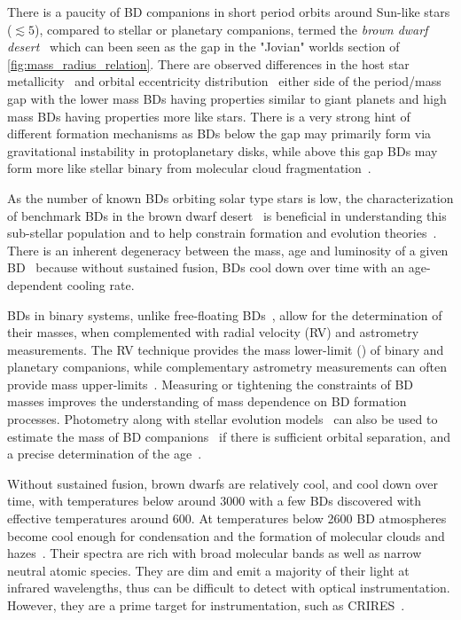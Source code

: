 There is a paucity of {BD} companions in short period orbits around Sun-like stars (\(\lesssim{}5 \)\AU{}), compared to stellar or planetary companions, termed the \emph{brown dwarf desert}~\citep{halbwachs_exploring_2000, zucker_analysis_2001, sahlmann_search_2011, ranc_moa2007blg197_2015} which can been seen as the gap in the "Jovian" worlds section of \cref{fig:mass_radius_relation}.
There are observed differences in the host star metallicity~\citep{maldonado_searching_2017, santos_observational_2017, schlaufman_evidence_2018} and orbital eccentricity distribution~\citep{ma_statistical_2014} either side of the period/mass gap with the lower mass {BD}s having properties similar to giant planets and high mass {BD}s having properties more like stars.
There is a very strong hint of different formation mechanisms as {BD}s below the gap may primarily form via gravitational instability in protoplanetary disks, while above this gap {BD}s may form more like stellar binary from molecular cloud fragmentation~\citep{ma_statistical_2014}.

As the number of known {BD}s orbiting solar type stars is low, the characterization of benchmark {BD}s in the brown dwarf desert~\citep[e.g.][]{crepp_trends_2016} is beneficial in understanding this sub-stellar population and to help constrain formation and evolution theories~\citep{whitworth_formation_2007}.
There is an inherent degeneracy between the mass, age and luminosity of a given BD~\citep{burrows_nongray_1997} because without sustained fusion, {BD}s cool down over time with an age-dependent cooling rate.

{BD}s in binary systems, unlike free-floating {BD}s~\citep[e.g][]{gagne_simp_2017}, allow for the determination of their masses, when complemented with radial velocity ({RV}) and astrometry measurements.
The {RV} technique provides the mass lower-limit (\Mtwosini{}) of binary and planetary companions, while complementary astrometry measurements can often provide mass upper-limits~\citep[e.g.][]{sahlmann_search_2011}.
Measuring or tightening the constraints of {BD} masses improves the understanding of mass dependence on {BD} formation processes.
Photometry along with stellar evolution models~\citep[e.g.][]{baraffe_evolutionary_2003,allard_btsettl_2013} can also be used to estimate the mass of {BD} companions~\citep[e.g.][]{moutou_eccentricity_2017} if there is sufficient orbital separation, and a precise determination of the age~\citep{soderblom_ages_2010}.


Without sustained fusion, brown dwarfs are relatively cool, and cool down over time, with temperatures below around {3000\K{}} with a few BDs discovered with effective temperatures around 600\K{}\citep{leggett_physical_2009}.
At temperatures below 2600\K{} BD atmospheres become cool enough for condensation and the formation of molecular clouds and hazes~\citep{allard_atmospheres_2012, helling_atmospheres_2014}.
Their spectra are rich with broad molecular bands as well as narrow neutral atomic species.
They are dim and emit a majority of their light at infrared wavelengths, thus can be difficult to detect with optical instrumentation.
However, they are a prime target for \nir{} instrumentation, such as CRIRES~\citep[e.g.][]{guenther_prospects_2005,crossfield_global_2014}.



